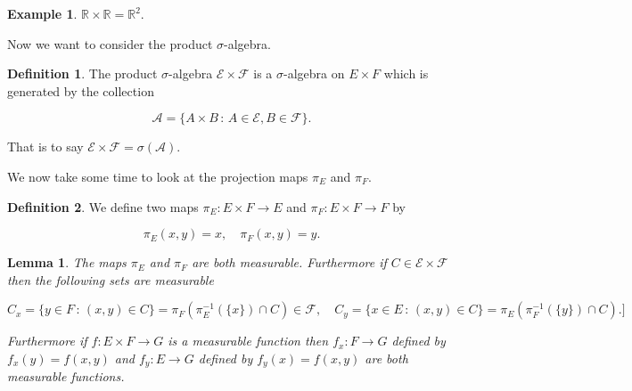 \documentclass[
]{book}
\newtheorem{lemma}{Lemma}[chapter]
\theoremstyle{definition}
\newtheorem{definition}{Definition}[chapter]
\theoremstyle{definition}
\newtheorem{example}{Example}[chapter]
\theoremstyle{definition}
\theoremstyle{definition}
\theoremstyle{remark}
\begin{document}
\begin{example}
\(\mathbb{R} \times \mathbb{R} = \mathbb{R}^2\).
\end{example}

Now we want to consider the product \(\sigma\)-algebra.

\begin{definition}
The product \(\sigma\)-algebra \(\mathcal{E} \times \mathcal{F}\) is a \(\sigma\)-algebra on \(E \times F\) which is generated by the collection

\[ \mathcal{A} = \{ A \times B \,:\, A \in \mathcal{E}, B \in \mathcal{F}\}. \]

That is to say \(\mathcal{E} \times \mathcal{F} = \sigma(\mathcal{A}).\)
\end{definition}

We now take some time to look at the projection maps \(\pi_E\) and \(\pi_F\).

\begin{definition}
We define two maps \(\pi_E: E \times F \rightarrow E\) and \(\pi_F: E \times F \rightarrow F\) by

\[ \pi_E (x,y) = x, \quad \pi_F(x,y) = y. \]
\end{definition}

\begin{lemma}
The maps \(\pi_E\) and \(\pi_F\) are both measurable. Furthermore if \(C \in \mathcal{E} \times \mathcal{F}\) then the following sets are measurable

\[ C_x = \{ y \in F \,:\, (x,y) \in C \} = \pi_F\left(\pi_E^{-1}(\{x\}) \cap C\right) \in \mathcal{F} , \quad C_y = \{ x \in E \,:\, (x,y) \in C\} = \pi_E \left( \pi_F^{-1}(\{y\}) \cap C \right). ] \]

Furthermore if \(f: E \times F \rightarrow G\) is a measurable function then \(f_x: F \rightarrow G\) defined by \(f_x(y) = f(x,y)\) and \(f_y: E \rightarrow G\) defined by \(f_y(x) = f(x,y)\) are both measurable functions.
\end{lemma}
\end{document}
